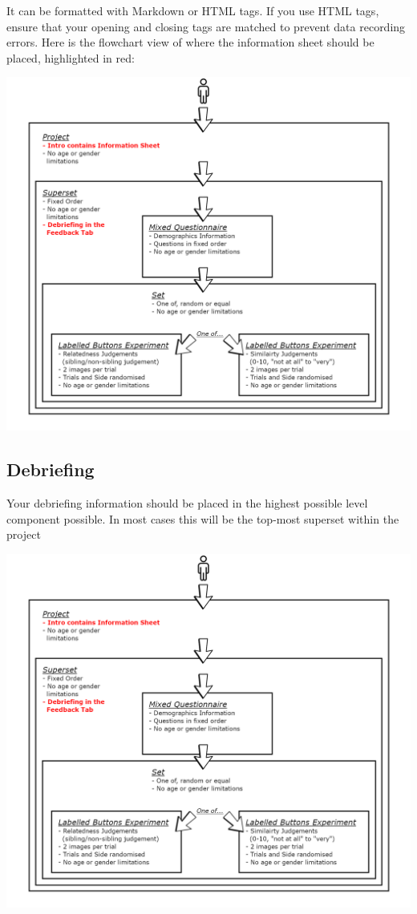 \documentclass[]{book}
\begin{document}
It can be formatted with Markdown or HTML tags. If you use HTML tags,
ensure that your opening and closing tags are matched to prevent data
recording errors. Here is the flowchart view of where the information
sheet should be placed, highlighted in red:

\includegraphics{images/screenshots/structure.png}

\hypertarget{debrief}{\subsection{Debriefing}\label{debrief}}

Your debriefing information should be placed in the highest possible
level component possible. In most cases this will be the top-most
superset within the project

\includegraphics{images/screenshots/structure.png}
\end{document}
